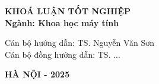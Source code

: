 \begin{center}
{\begin{minipage}{0.85\textwidth}
\vspace{2.5cm}

{\fontsize{14}{18}\selectfont\bfseries
KHOÁ LUẬN TỐT NGHIỆP\\
\vspace{0.6cm}
Ngành: Khoa học máy tính\\
}

\vspace{2.5cm}

{\fontsize{13}{17}\selectfont
Cán bộ hướng dẫn: TS. Nguyễn Văn Sơn\\
\vspace{0.4cm}
Cán bộ đồng hướng dẫn: TS. ...\\
}

\vspace{3cm}

{\fontsize{14}{18}\selectfont\bfseries
HÀ NỘI - 2025\\
}

\vspace{2.5cm}

\end{minipage}
}

\end{center}

\newpage

